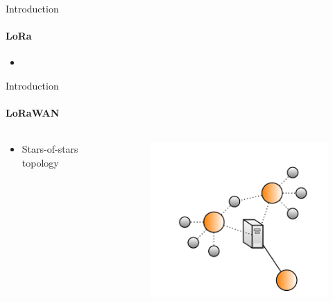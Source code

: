 \begin{frame}{Introduction}
\framesubtitle{LoRa}
\begin{itemize}
  \item 
\end{itemize}
\end{frame}

\begin{frame}{Introduction}
\framesubtitle{LoRaWAN}
\begin{columns}
\begin{column}{0.5\textwidth}
\begin{itemize}
    \item Stars-of-stars topology
\end{itemize}
\end{column}
\begin{column}{0.5\textwidth}
\begin{figure}
\includegraphics[width=1\textwidth]{presentation.tex/fig/starsofstars.png}
\end{figure}
\end{column}
\end{columns}
\end{frame}


